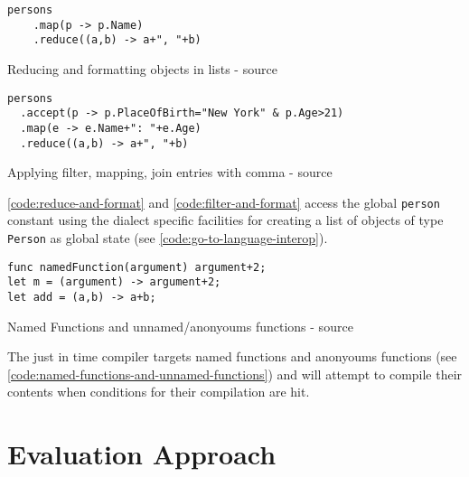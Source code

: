 \begin{listing}[H]
    \begin{verbatim}
persons
    .map(p -> p.Name)
    .reduce((a,b) -> a+", "+b)
    \end{verbatim}
    \caption{Reducing and formatting objects in lists - source \cite{parser2_xnacly}}
    \label{code:reduce-and-format}
\end{listing}

\begin{listing}[H]
    \begin{verbatim}
persons
  .accept(p -> p.PlaceOfBirth="New York" & p.Age>21)
  .map(e -> e.Name+": "+e.Age)
  .reduce((a,b) -> a+", "+b)
    \end{verbatim}
    \caption{Applying filter, mapping, join entries with comma - source \cite{parser2_xnacly}}
    \label{code:filter-and-format}
\end{listing}


\autoref{code:reduce-and-format} and \autoref{code:filter-and-format} access
the global \texttt{person} constant using the dialect specific facilities for
creating a list of objects of type \texttt{Person} as global state (see
\autoref{code:go-to-language-interop}).

\begin{listing}[H]
    \begin{verbatim}
func namedFunction(argument) argument+2;
let m = (argument) -> argument+2;
let add = (a,b) -> a+b;
    \end{verbatim}
    \caption{Named Functions and unnamed/anonyoums functions - source \cite{parser2_xnacly}}
    \label{code:named-functions-and-unnamed-functions}
\end{listing}


The just in time compiler targets named functions and anonyoums functions (see
\autoref{code:named-functions-and-unnamed-functions}) and will attempt to
compile their contents when conditions for their compilation are hit.


\section{Evaluation Approach}


